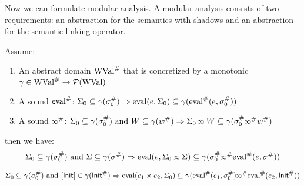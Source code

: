 Now we can formulate modular analysis.
A modular analysis consists of two requirements: an abstraction for the semantics with shadows and an abstraction for the semantic linking operator.
\begin{thm}
  Assume:
  \begin{enumerate}
    \item An abstract domain ${\text{WVal}}^{\#}$ that is concretized by a monotonic $\gamma\in{\text{WVal}}^{\#}\rightarrow\mathcal{P}(\text{WVal})$
    \item A sound ${\text{eval}}^{\#}$: $\Sigma_0\subseteq\gamma({\sigma}^{\#}_0)\Rightarrow\text{eval}(e,\Sigma_0)\subseteq\gamma({\text{eval}}^{\#}(e,{\sigma}^{\#}_0))$
    \item A sound $\Abs\semlink$: $\Sigma_0\subseteq\gamma(\Abs\ctx_0)\text{ and }W\subseteq\gamma(\Abs{w})\Rightarrow\Sigma_0\semlink W\subseteq\gamma(\Abs\ctx_0\Abs\semlink\Abs{w})$
  \end{enumerate}
  then we have:
  \[\Sigma_0\subseteq\gamma(\Abs\ctx_0)\text{ and }\Sigma\subseteq\gamma(\Abs\ctx)\Rightarrow\eval(e,\Sigma_0\semlink\Sigma)\subseteq\gamma(\Abs\ctx_0\Abs\semlink\Abs\eval(e,\Abs\ctx))\]
\end{thm}
\begin{cor}
  \[\Sigma_0\subseteq\gamma(\Abs\ctx_0)\text{ and }[\InitE]\in\gamma(\Abs\InitE)\Rightarrow\eval(e_1\synlink e_2,\Sigma_0)\subseteq\gamma(\Abs\eval(e_1,\Abs\ctx_0)\Abs\semlink\Abs\eval(e_2,\Abs\InitE))\]
\end{cor}
